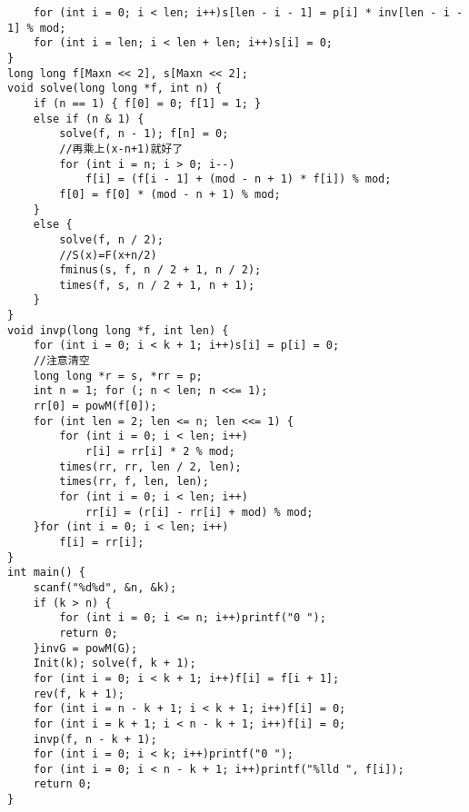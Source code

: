\begin{verbatim}
    for (int i = 0; i < len; i++)s[len - i - 1] = p[i] * inv[len - i - 1] % mod;
    for (int i = len; i < len + len; i++)s[i] = 0;
}
long long f[Maxn << 2], s[Maxn << 2];
void solve(long long *f, int n) {
    if (n == 1) { f[0] = 0; f[1] = 1; }
    else if (n & 1) {
        solve(f, n - 1); f[n] = 0;
        //再乘上(x-n+1)就好了
        for (int i = n; i > 0; i--)
            f[i] = (f[i - 1] + (mod - n + 1) * f[i]) % mod;
        f[0] = f[0] * (mod - n + 1) % mod;
    }
    else {
        solve(f, n / 2);
        //S(x)=F(x+n/2)
        fminus(s, f, n / 2 + 1, n / 2);
        times(f, s, n / 2 + 1, n + 1);
    }
}
void invp(long long *f, int len) {
    for (int i = 0; i < k + 1; i++)s[i] = p[i] = 0;
    //注意清空 
    long long *r = s, *rr = p;
    int n = 1; for (; n < len; n <<= 1);
    rr[0] = powM(f[0]);
    for (int len = 2; len <= n; len <<= 1) {
        for (int i = 0; i < len; i++)
            r[i] = rr[i] * 2 % mod;
        times(rr, rr, len / 2, len);
        times(rr, f, len, len);
        for (int i = 0; i < len; i++)
            rr[i] = (r[i] - rr[i] + mod) % mod;
    }for (int i = 0; i < len; i++)
        f[i] = rr[i];
}
int main() {
    scanf("%d%d", &n, &k);
    if (k > n) {
        for (int i = 0; i <= n; i++)printf("0 ");
        return 0;
    }invG = powM(G);
    Init(k); solve(f, k + 1);
    for (int i = 0; i < k + 1; i++)f[i] = f[i + 1];
    rev(f, k + 1);
    for (int i = n - k + 1; i < k + 1; i++)f[i] = 0;
    for (int i = k + 1; i < n - k + 1; i++)f[i] = 0;
    invp(f, n - k + 1);
    for (int i = 0; i < k; i++)printf("0 ");
    for (int i = 0; i < n - k + 1; i++)printf("%lld ", f[i]);
    return 0;
}

\end{verbatim}
